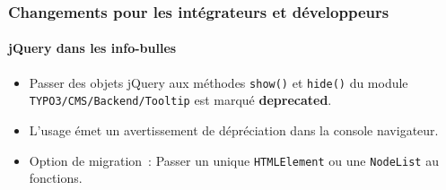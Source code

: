 %

\begin{frame}[fragile]
	\frametitle{Changements pour les intégrateurs et développeurs}
	\framesubtitle{jQuery dans les info-bulles}


	\begin{itemize}
		\item Passer des objets jQuery aux méthodes \texttt{show()} et \texttt{hide()}
			du module \texttt{TYPO3/CMS/Backend/Tooltip} est marqué
			\textbf{deprecated}.
		\item L'usage émet un avertissement de dépréciation dans la console navigateur.
		\item Option de migration~:
			Passer un unique \texttt{HTMLElement} ou une \texttt{NodeList} au fonctions.
	\end{itemize}

\end{frame}

